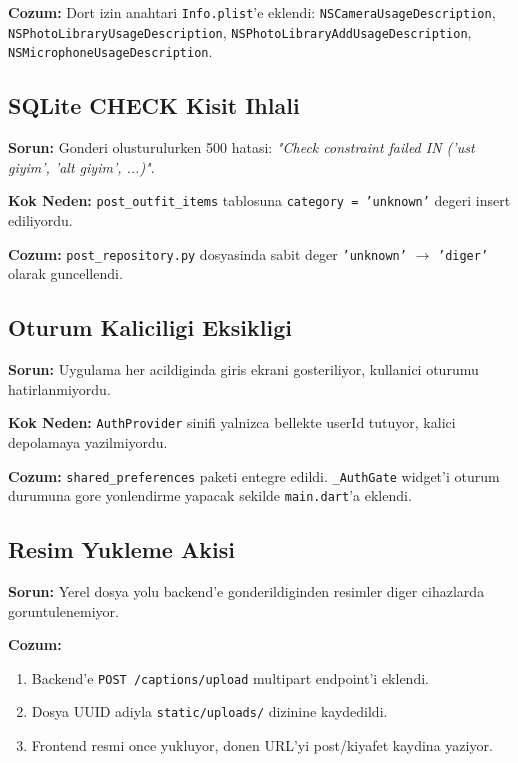 \documentclass[conference]{IEEEtran}
\begin{document}
\textbf{Cozum:} Dort izin anahtari \texttt{Info.plist}'e eklendi: \texttt{NSCameraUsageDescription}, \texttt{NSPhotoLibraryUsageDescription}, \texttt{NSPhotoLibraryAddUsageDescription}, \texttt{NSMicrophoneUsageDescription}.

\subsection{SQLite CHECK Kisit Ihlali}

\textbf{Sorun:} Gonderi olusturulurken 500 hatasi: \textit{"Check constraint failed IN ('ust giyim', 'alt giyim', ...)"}.

\textbf{Kok Neden:} \texttt{post\_outfit\_items} tablosuna \texttt{category = 'unknown'} degeri insert ediliyordu.

\textbf{Cozum:} \texttt{post\_repository.py} dosyasinda sabit deger \texttt{'unknown'} $\rightarrow$ \texttt{'diger'} olarak guncellendi.

\subsection{Oturum Kaliciligi Eksikligi}

\textbf{Sorun:} Uygulama her acildiginda giris ekrani gosteriliyor, kullanici oturumu hatirlanmiyordu.

\textbf{Kok Neden:} \texttt{AuthProvider} sinifi yalnizca bellekte userId tutuyor, kalici depolamaya yazilmiyordu.

\textbf{Cozum:} \texttt{shared\_preferences} paketi entegre edildi. \texttt{\_AuthGate} widget'i oturum durumuna gore yonlendirme yapacak sekilde \texttt{main.dart}'a eklendi.

\subsection{Resim Yukleme Akisi}

\textbf{Sorun:} Yerel dosya yolu backend'e gonderildiginden resimler diger cihazlarda goruntulenemiyor.

\textbf{Cozum:}
\begin{enumerate}
  \item Backend'e \texttt{POST /captions/upload} multipart endpoint'i eklendi.
  \item Dosya UUID adiyla \texttt{static/uploads/} dizinine kaydedildi.
  \item Frontend resmi once yukluyor, donen URL'yi post/kiyafet kaydina yaziyor.
\end{enumerate}
\end{document}

